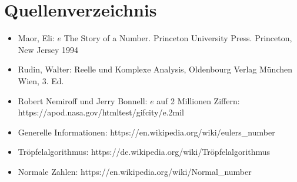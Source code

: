 \section{Quellenverzeichnis}
\begin{itemize}
  \item Maor, Eli: $e$ The Story of a Number. Princeton University Press. Princeton, New Jersey 1994
  \item Rudin, Walter: Reelle und Komplexe Analysis, Oldenbourg Verlag München Wien, 3. Ed.
  \item  Robert Nemiroff und Jerry Bonnell: $e$ auf 2 Millionen Ziffern: https://apod.nasa.gov/htmltest/gifcity/e.2mil
  \item Generelle Informationen: https://en.wikipedia.org/wiki/eulers\_number
  \item Tröpfelalgorithmus: https://de.wikipedia.org/wiki/Tröpfelalgorithmus
  \item Normale Zahlen: https://en.wikipedia.org/wiki/Normal\_number
\end{itemize}
